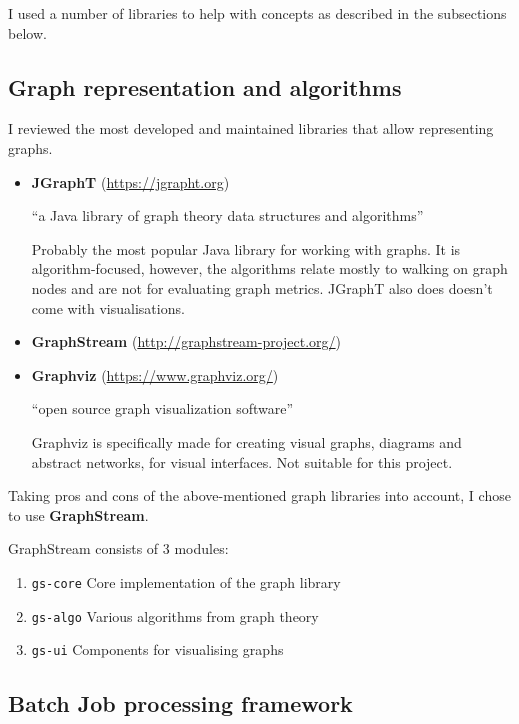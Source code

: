 I used a number of libraries to help with concepts as described in the subsections below.

\subsection{Graph representation and algorithms}

I reviewed the most developed and maintained libraries that allow representing graphs.

\begin{itemize}
    \item \textbf{JGraphT} (\url{https://jgrapht.org})

    \enquote{a Java library of graph theory data structures and algorithms}

    Probably the most popular Java library for working with graphs.
    It is algorithm-focused, however, the algorithms relate mostly to walking on graph nodes and are not for evaluating graph metrics.
    JGraphT also does doesn't come with visualisations.

    \item \textbf{GraphStream} (\url{http://graphstream-project.org/})



    \item \textbf{Graphviz} (\url{https://www.graphviz.org/})

    \enquote{open source graph visualization software}

    Graphviz is specifically made for creating visual graphs, diagrams and abstract networks, for visual interfaces.
    Not suitable for this project.
\end{itemize}

Taking pros and cons of the above-mentioned graph libraries into account, I chose to use \textbf{GraphStream}.

GraphStream consists of 3 modules:

\begin{enumerate}
    \item \texttt{gs-core} Core implementation of the graph library
    \item \texttt{gs-algo} Various algorithms from graph theory
    \item \texttt{gs-ui} Components for visualising graphs
\end{enumerate}

\subsection{Batch Job processing framework}

